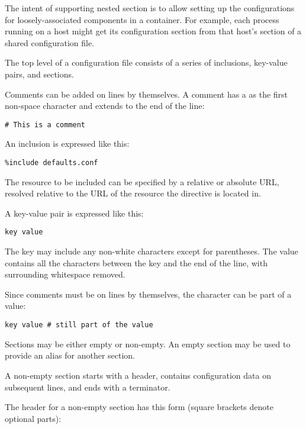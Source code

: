 \documentclass{howto}
\begin{document}
The intent of supporting nested section is to allow setting up the
configurations for loosely-associated components in a container.  For
example, each process running on a host might get its configuration
section from that host's section of a shared configuration file.

The top level of a configuration file consists of a series of
inclusions, key-value pairs, and sections.

Comments can be added on lines by themselves.  A comment has a
\character{\#} as the first non-space character and extends to the end
of the line:

\begin{verbatim}
# This is a comment
\end{verbatim}

An inclusion is expressed like this:

\begin{verbatim}
%include defaults.conf
\end{verbatim}

The resource to be included can be specified by a relative or absolute
URL, resolved relative to the URL of the resource the
 directive is located in.


A key-value pair is expressed like this:

\begin{verbatim}
key value
\end{verbatim}

The key may include any non-white characters except for parentheses.
The value contains all the characters between the key and the end of
the line, with surrounding whitespace removed.

Since comments must be on lines by themselves, the \character{\#}
character can be part of a value:

\begin{verbatim}
key value # still part of the value
\end{verbatim}

Sections may be either empty or non-empty.  An empty section may be
used to provide an alias for another section.

A non-empty section starts with a header, contains configuration
data on subsequent lines, and ends with a terminator.

The header for a non-empty section has this form (square brackets
denote optional parts):
\end{document}
